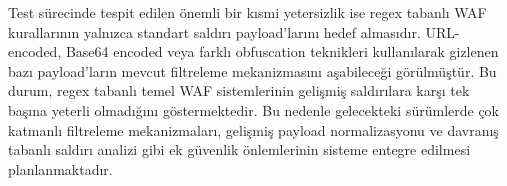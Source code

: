 Test sürecinde tespit edilen önemli bir kısmi yetersizlik ise regex tabanlı WAF kurallarının yalnızca standart saldırı payload’larını hedef almasıdır. URL-encoded, Base64 encoded veya farklı obfuscation teknikleri kullanılarak gizlenen bazı payload’ların mevcut filtreleme mekanizmasını aşabileceği görülmüştür. Bu durum, regex tabanlı temel WAF sistemlerinin gelişmiş saldırılara karşı tek başına yeterli olmadığını göstermektedir. Bu nedenle gelecekteki sürümlerde çok katmanlı filtreleme mekanizmaları, gelişmiş payload normalizasyonu ve davranış tabanlı saldırı analizi gibi ek güvenlik önlemlerinin sisteme entegre edilmesi planlanmaktadır.


\clearpage
